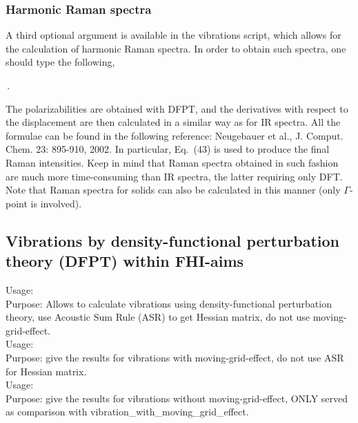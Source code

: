 \subsubsection*{Harmonic Raman spectra}

A third optional argument is available in the vibrations script, which allows for the calculation of harmonic Raman spectra.
In order to obtain such spectra, one should type the following,

 \,.

The polarizabilities are obtained with DFPT, and the derivatives with respect to the displacement are then calculated
in a similar way as for IR spectra.
All the formulae can be found in the following reference: Neugebauer et al., J. Comput. Chem. 23: 895-910, 2002.
In particular, Eq.~(43) is used to produce the final Raman intensities.
Keep in mind that Raman spectra obtained in such fashion are much more time-consuming than IR spectra, the latter requiring only DFT.
Note that Raman spectra for solids can also be calculated in this manner (only $\Gamma$-point is involved).

\subsection*{Vibrations by density-functional perturbation theory (DFPT) within FHI-aims}
{
Usage:  \\[1.0em]
  Purpose:  Allows to calculate vibrations using density-functional perturbation theory, use Acoustic Sum Rule (ASR) to get Hessian matrix, do not use moving-grid-effect.\\


Usage:  \\[1.0em]
  Purpose: give the results for vibrations with moving-grid-effect, do not use ASR for Hessian matrix.\\ 

Usage:  \\[1.0em]
  Purpose: give the results for vibrations without moving-grid-effect, ONLY served as comparison with vibration\_with\_moving\_grid\_effect.\\ }



